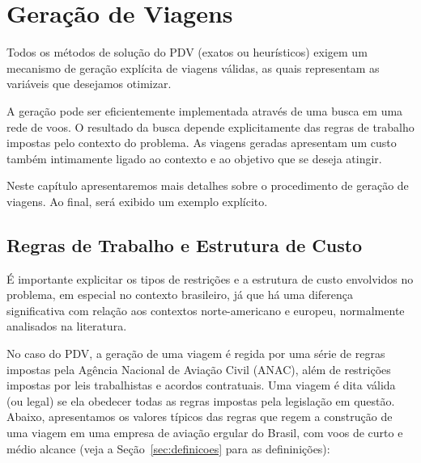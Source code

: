 \zerar
\chapter{Geração de Viagens}
\label{cap:geracao}

Todos os métodos de solução do PDV (exatos ou heurísticos) exigem um mecanismo de geração 
explícita de viagens válidas, as quais representam as variáveis que desejamos otimizar. 

A geração pode ser eficientemente implementada através de uma busca em uma rede de voos. 
O resultado da busca depende explicitamente das regras de trabalho impostas pelo contexto do
problema. As viagens geradas apresentam um custo também intimamente ligado ao contexto e ao 
objetivo que se deseja atingir. 

Neste capítulo apresentaremos mais detalhes sobre o procedimento de geração de viagens. Ao final,
será exibido um exemplo explícito.


\section{Regras de Trabalho e Estrutura de Custo}
\label{sec:regras_e_custos}

É importante explicitar os tipos de restrições e a estrutura de custo envolvidos no problema, em 
especial no contexto brasileiro, já que há uma diferença significativa com relação aos contextos 
norte-americano e europeu, normalmente analisados na literatura.

No caso do PDV, a geração de uma viagem é regida por uma série de regras impostas pela Agência
Nacional de Aviação Civil (ANAC), além de restrições impostas por leis trabalhistas e acordos
contratuais. Uma viagem é dita válida (ou legal) se ela obedecer todas as regras impostas pela
legislação em questão. Abaixo, apresentamos os valores típicos das regras que regem a construção de
uma viagem em uma empresa de aviação ergular do Brasil, com voos de curto e médio alcance (veja a
Seção~\ref{sec:definicoes} para as defininições):

